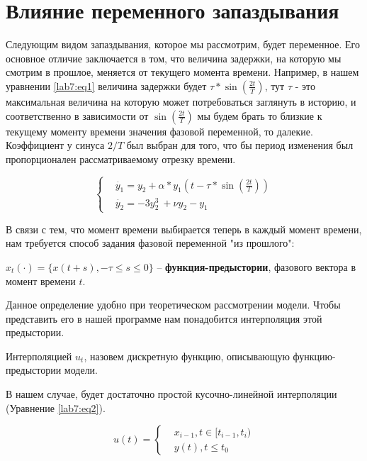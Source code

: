 \chapter{Влияние переменного запаздывания}\label{lab7}

Следующим видом запаздывания, которое мы рассмотрим, будет
переменное. Его основное отличие заключается в том, что
величина задержки, на которую мы смотрим в прошлое,
меняется от текущего момента времени. Например,
в нашем уравнении \eqref{lab7:eq1} величина задержки будет
$\tau*\sin(\frac{2t}{T})$, тут $\tau$ - это максимальная
величина на которую может потребоваться заглянуть в историю,
и соответственно в зависимости от $\sin(\frac{2t}{T})$ мы будем
брать то близкие к текущему моменту времени значения фазовой
переменной, то далекие. Коэффициент у синуса $2/T$ был выбран для того,
что бы период изменения был пропорционален рассматриваемому
отрезку времени.

\begin{equation}\label{lab7:eq1}
  \begin{cases}
      &\dot{y_1} = y_2 + \alpha * y_1(t-\tau*\sin(\frac{2t}{T}))\\
      &\dot{y_2} = -3y_2^3\ + \nu y_2 - y_1
  \end{cases}
\end{equation}

В связи с тем, что момент времени выбирается теперь в каждый момент
времени, нам требуется способ задания фазовой переменной "из прошлого":

\begin{definition}
    $x_t(\cdot) = \{x(t + s), -\tau \leq s \leq 0 \}$ --
    \textbf{функция-предыстории}, фазового вектора в момент времени $t$.
\end{definition}

Данное определение удобно при теоретическом рассмотрении модели.
Чтобы представить его в нашей программе нам понадобится интерполяция
этой предыстории.

\begin{definition}
    Интерполяцией $u_t$, назовем дискретную функцию,
    описывающую функцию-предыстории модели.
\end{definition}

В нашем случае, будет достаточно
простой кусочно-линейной интерполяции (Уравнение \eqref{lab7:eq2}).

\begin{equation}\label{lab7:eq2}
    u(t) = \begin{cases}
        &x_{i-1}, t \in [t_{i-1}, t_i) \\
        &y(t), t \leq t_0
    \end{cases}
\end{equation}

